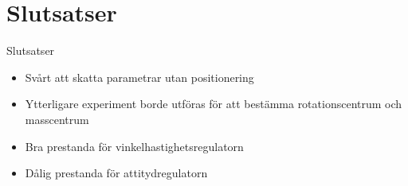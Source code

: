 \documentclass[11pt,aspectratio=169]{beamer}
\begin{document}
\begin{frame}
\end{frame}


\section{Slutsatser}
\begin{frame}{Slutsatser}
\begin{itemize}
\item Svårt att skatta parametrar utan positionering
\item Ytterligare experiment borde utföras för att bestämma rotationscentrum och masscentrum
\item Bra prestanda för vinkelhastighetsregulatorn
\item Dålig prestanda för attitydregulatorn
\end{itemize}
\end{frame}
\end{document}
